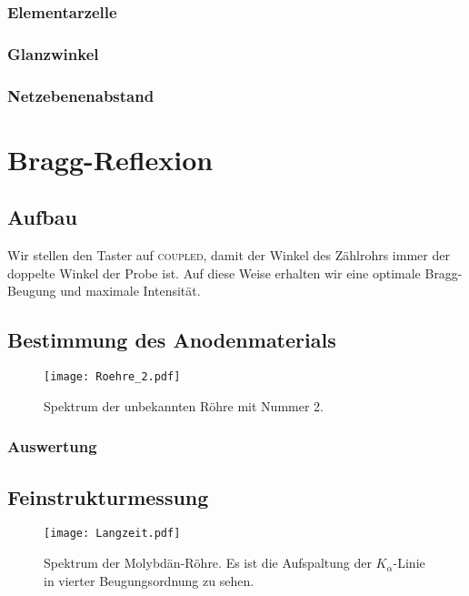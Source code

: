 \subsection{Elementarzelle}

\subsection{Glanzwinkel}

\subsection{Netzebenenabstand}

\chapter{Bragg-Reflexion}

\section{Aufbau}

\parencite{wikipedia/Goniometer}
\parencite{wikipedia/hygroskopie}
\parencite{leybold/554831}
\parencite{leybold/554800}

Wir stellen den Taster auf \textsc{coupled}, damit der Winkel des Zählrohrs immer
der doppelte Winkel der Probe ist. \parencite{leybold/554800} Auf diese Weise
erhalten wir eine optimale Bragg-Beugung und maximale Intensität.

\section{Bestimmung des Anodenmaterials}

\begin{figure}[htbp]
    \centering
    \texttt{[image: Roehre\_2.pdf]}
    \caption{%
        Spektrum der unbekannten Röhre mit Nummer 2.
    }
    \label{fig:}
\end{figure}

\subsection{Auswertung}

\section{Feinstrukturmessung}

\begin{figure}[htbp]
    \centering
    \texttt{[image: Langzeit.pdf]}
    \caption{%
        Spektrum der Molybdän-Röhre. Es ist die Aufspaltung der
        $K_\alpha$-Linie in vierter Beugungsordnung zu sehen.
    }
    \label{fig:}
\end{figure}

